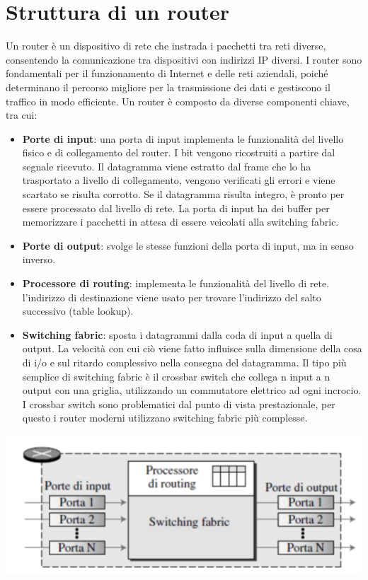 \documentclass[12pt]{report}
\begin{document}
\section{Struttura di un router}
Un router è un dispositivo di rete che instrada i pacchetti tra reti diverse, consentendo la comunicazione tra dispositivi con indirizzi IP diversi. I router sono fondamentali per il funzionamento di Internet e delle reti aziendali, poiché determinano il percorso migliore per la trasmissione dei dati e gestiscono il traffico in modo efficiente. Un router è composto da diverse componenti chiave, tra cui:
\begin{itemize}
	\item \textbf{Porte di input}: una porta di input implementa le funzionalità del livello fisico e di collegamento del router. I bit vengono ricostruiti a partire dal segnale ricevuto. Il datagramma viene estratto dal frame che lo ha trasportato a livello di collegamento, vengono verificati gli errori e viene scartato se risulta corrotto. Se il datagramma risulta 
	integro, è pronto per essere processato dal livello di rete. La porta di input ha dei buffer per memorizzare i pacchetti in attesa di essere veicolati alla switching fabric.
	\item \textbf{Porte di output}: svolge le stesse funzioni della porta di input, ma in senso inverso.
	\item \textbf{Processore di routing}: implementa le funzionalità del livello di rete. l'indirizzo di destinazione viene usato per trovare l'indirizzo del salto successivo (table lookup).
	\item \textbf{Switching fabric}: sposta i datagrammi dalla coda di input a quella di output. La velocità con cui ciò viene fatto influisce sulla dimensione della cosa di i/o e sul ritardo complessivo nella consegna del datagramma. Il tipo più semplice di switching fabric è il crossbar switch che collega n input a n output con una griglia, utilizzando un commutatore elettrico ad ogni incrocio. I crossbar switch sono problematici dal punto di vista prestazionale, per questo i router moderni utilizzano switching fabric più complesse.
\end{itemize}
\begin{center}
	\includegraphics[scale=0.4]{assets/router-struct.png}
\end{center}
\end{document}
